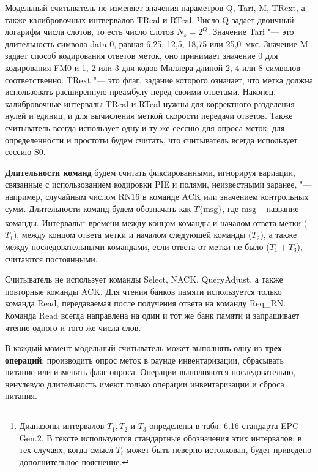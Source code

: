 Модельный считыватель не изменяет значения параметров Q, Tari, M, TRext, а также калибровочных интвервалов TRcal и RTcal. Число Q задает двоичный логарифм числа слотов, то есть число слотов $N_s = 2^Q$. Значение Tari "--- это длительность символа data-0, равная 6,25, 12,5, 18,75 или 25,0~мкс. Значение M задает способ кодирования ответов меток, оно принимает значение 0 для кодирования FM0 и 1, 2 или 3 для кодов Миллера длиной 2, 4 или 8 символов соответственно. TRext "--- это флаг, задание которого означает, что метка должна использовать расширенную преамбулу перед своими ответами. Наконец, калибровочные интервалы TRcal и RTcal нужны для корректного разделения нулей и единиц, и для вычисления меткой скорости передачи ответов. Также считыватель всегда использует одну и ту же сессию для опроса меток; для определенности и простоты будем считать, что считыватель всегда использует сессию S0.

\textbf{Длительности команд} будем считать фиксированными, игнорируя вариации, связанные с использованием кодировки PIE и полями, неизвестными заранее, "--- например, случайным числом RN16 в команде ACK или значением контрольных сумм. Длительности команд будем обозначать как $T\{\text{msg}\}$, где $\text{msg}$ -- название команды. Интервалы\footnote{Диапазоны интервалов $T_1, T_2 \text{ и } T_3$ определены в табл. 6.16 стандарта EPC Gen.2. В тексте используются стандартные обозначения этих интервалов; в тех случаях, когда смысл $T_i$ может быть неверно истолкован, будет приведено дополнительное пояснение.} времени между концом команды и началом ответа метки ($T_1$), между концом ответа метки и началом следующей команды ($T_2$), а также между последовательными командами, если ответа от метки не было ($T_1 + T_3$), считаются постоянными.

Считыватель не использует команды Select, NACK, QueryAdjust, а также повторные команды ACK. Для чтения банков памяти используется только команда Read, передаваемая после получения ответа на команду Req\_RN. Команда Read всегда направлена на один и тот же банк памяти и запрашивает чтение одного и того же числа слов.

В каждый момент модельный считыватель может выполнять одну из \textbf{трех операций}: производить опрос меток в раунде инвентаризации, сбрасывать питание или изменять флаг опроса. Операции выполняются последовательно, ненулевую длительность имеют только операции инвентаризации и сброса питания.


